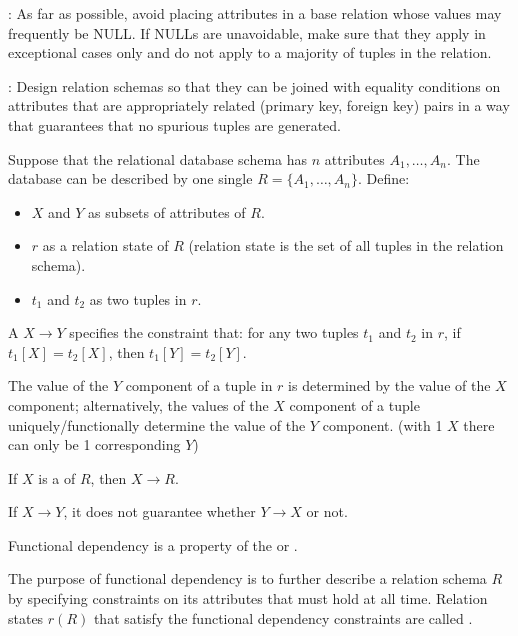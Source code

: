     \par {}: As far as possible, avoid placing attributes in a base relation whose values may frequently be NULL. If NULLs are unavoidable, make sure that they apply in exceptional cases only and do not apply to a majority of tuples in the relation.

    \par {}: Design relation schemas so that they can be joined with equality conditions on attributes that are appropriately related (primary key, foreign key) pairs in a way that guarantees that no spurious tuples are generated.


    \par Suppose that the relational database schema has $n$ attributes $A_1 , \ldots, A_n$. The database can be described by one single  $R = \{A_1, \ldots, A_n\}$. Define:
    \begin{itemize}
      \item $X$ and $Y$ as subsets of attributes of $R$.
      \item $r$ as a relation state of $R$ (relation state is the set of all tuples in the relation schema).
      \item $t_1$ and $t_2$ as two tuples in $r$.
    \end{itemize}
    \par A  $X \to Y$ specifies the constraint that: for any two tuples $t_1$ and $t_2$ in $r$, if $t_1[X] = t_2[X]$, then $t_1[Y] = t_2[Y]$.
    \par The value of the $Y$ component of a tuple in $r$ is determined by the value of the $X$ component; alternatively, the values of the $X$ component of a tuple uniquely/functionally determine the value of the $Y$ component. (with 1 $X$ there can only be 1 corresponding $Y$)
    \par If $X$ is a  of $R$, then $X \to R$.
    \par If $X \to Y$, it does not guarantee whether $Y \to X$ or not.
    \par Functional dependency is a property of the  or .
    \par The purpose of functional dependency is to further describe a relation schema $R$ by specifying constraints on its attributes that must hold at all time. Relation states $r(R)$ that satisfy the functional dependency constraints are called .

